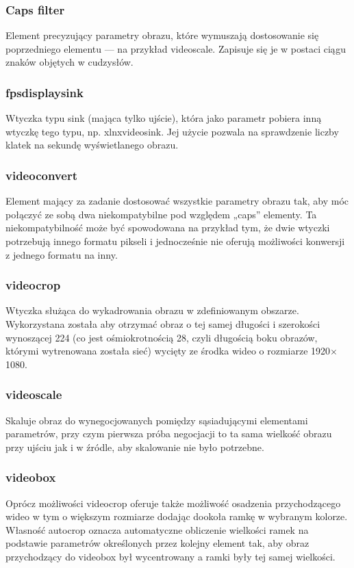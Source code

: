 \documentclass[12pt, oneside]{article}
\begin{document}
\subsubsection{Caps filter}
Element precyzujący parametry obrazu, które wymuszają
dostosowanie się poprzedniego elementu --- na przykład videoscale.
Zapisuje się je w postaci ciągu znaków objętych w cudzysłów.

\subsubsection{fpsdisplaysink}
Wtyczka typu sink (mająca tylko ujście), która jako parametr
pobiera inną wtyczkę tego typu, np. xlnxvideosink. Jej użycie
pozwala na sprawdzenie liczby klatek na sekundę wyświetlanego
obrazu.

\subsubsection{videoconvert}
Element mający za zadanie dostosować wszystkie parametry obrazu tak,
aby móc połączyć ze sobą dwa niekompatybilne pod względem „caps” elementy.
Ta niekompatybilność może być spowodowana na przykład tym, że dwie
wtyczki potrzebują innego formatu pikseli i jednocześnie nie oferują
możliwości konwersji z jednego formatu na inny.

\subsubsection{videocrop}
Wtyczka służąca do wykadrowania obrazu w zdefiniowanym obszarze.
Wykorzystana została aby otrzymać obraz o tej samej długości
i szerokości wynoszącej 224 (co jest ośmiokrotnością 28, czyli
długością boku obrazów, którymi wytrenowana została sieć) wycięty
ze środka wideo o rozmiarze 1920\(\times \)1080.

\subsubsection{videoscale}
Skaluje obraz do wynegocjowanych pomiędzy sąsiadującymi elementami
parametrów, przy czym pierwsza próba negocjacji to ta sama wielkość
obrazu przy ujściu jak i w źródle, aby skalowanie nie było potrzebne.

\subsubsection{videobox}
Oprócz możliwości videocrop oferuje także możliwość osadzenia
przychodzącego wideo w tym o większym rozmiarze dodając dookoła ramkę
w wybranym kolorze. Własność autocrop oznacza automatyczne obliczenie
wielkości ramek na podstawie parametrów określonych przez kolejny element tak,
aby obraz przychodzący do videobox był wycentrowany a ramki
były tej samej wielkości.
\end{document}
